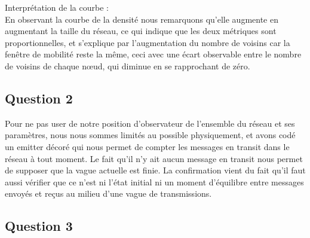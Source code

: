 \documentclass[10pt]{report}
\begin{document}
Interprétation de la courbe :\\

En observant la courbe de la densité nous remarquons qu'elle augmente en augmentant la taille du réseau, ce qui indique que les deux métriques sont proportionnelles, et s'explique par l'augmentation du nombre de voisins car la fenêtre de mobilité reste la même, ceci avec une écart observable entre le nombre de voisins de chaque nœud, qui diminue en se rapprochant de zéro.

\subsection{Question 2}

Pour ne pas user de notre position d'observateur de l'ensemble du réseau et ses paramètres, nous nous sommes limités au possible physiquement, et avons codé un emitter décoré qui nous permet de compter les messages en transit dans le réseau à tout moment.
Le fait qu'il n'y ait aucun message en transit nous permet de supposer que la vague actuelle est finie. La confirmation vient du fait qu'il faut aussi vérifier que ce n'est ni l'état initial ni un moment d'équilibre entre messages envoyés et reçus au milieu d'une vague de transmissions.

\newpage
\subsection{Question 3}
\end{document}
